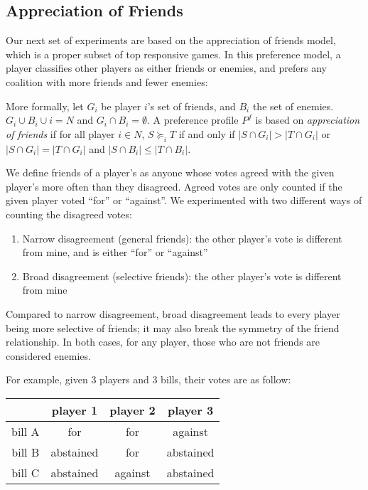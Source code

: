 \subsection{Appreciation of Friends}
\label{subsec:appreciation_of_friends}

Our next set of experiments are based on the appreciation of friends model,
which is a proper subset of top responsive games.
In this preference model, a player classifies other players as either friends
or enemies, and prefers any coalition with more friends and fewer enemies:

More formally, let $G_i$ be player $i$'s set of friends, and $B_i$ the set of enemies. $G_i \cup B_i \cup i = N$ and $G_i \cap B_i = \emptyset$. A preference profile $P^f$ is based on \textit{appreciation of friends} if for all player $i \in N$, $S \succeq_i T$ if and only if $|S \cap G_i| > |T \cap G_i|$ or $|S \cap G_i| = |T \cap G_i|$ and $|S \cap B_i| \leq |T \cap B_i|$.

We define friends of a player's as anyone whose votes agreed with the given
player's more often than they disagreed.
Agreed votes are only counted if the given player voted ``for'' or ``against''.
We experimented with two different ways of counting the disagreed votes:

\begin{enumerate}
  \item Narrow disagreement (general friends): the other player's vote is different from mine, and is either ``for'' or ``against''
  \item Broad disagreement (selective friends): the other player's vote is different from mine
\end{enumerate}

Compared to narrow disagreement, broad disagreement leads to every player being
more selective of friends; it may also break the symmetry of the friend
relationship.
In both cases, for any player, those who are not friends are considered enemies.

\begin{example}
\label{example:votes_friends}
  For example, given 3 players and 3 bills, their votes are as follow:

  \begin{table}[ht]
  \centering
  \begin{tabular}{|c|c|c|c|}
  \hline
         & player 1  & player 2 & player 3 \\ \hline
  bill A & for       & for      & against \\
  bill B & abstained & for      & abstained \\
  bill C & abstained & against  & abstained \\
  \hline
  \end{tabular}
  \end{table}

\end{example}

